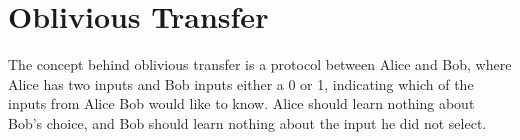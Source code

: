 \section{Oblivious Transfer}

The concept behind oblivious transfer is 
a protocol between Alice and Bob, where 
Alice has two inputs and Bob inputs either 
a 0 or 1, indicating which of the inputs 
from Alice Bob would like to know. 
Alice should learn nothing about Bob's choice, 
and Bob should learn nothing about the 
input he did not select. 